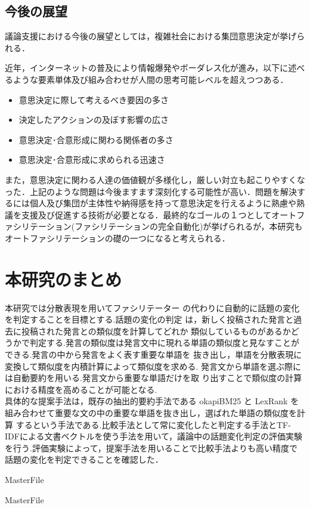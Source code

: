\subsection{今後の展望}
\label{con:future}
議論支援における今後の展望としては，複雑社会における集団意思決定が挙げられる．

近年，インターネットの普及により情報爆発やボーダレス化が進み，以下に述べるような要素単体及び組み合わせが人間の思考可能レベルを超えつつある．
\begin{itemize}
  \item 意思決定に際して考えるべき要因の多さ
  \item 決定したアクションの及ぼす影響の広さ
  \item 意思決定･合意形成に関わる関係者の多さ
  \item 意思決定･合意形成に求められる迅速さ
\end{itemize}
また，意思決定に関わる人達の価値観が多様化し，厳しい対立も起こりやすくなった．上記のような問題は今後ますます深刻化する可能性が高い．問題を解決するには個人及び集団が主体性や納得感を持って意思決定を行えるように熟慮や熟議を支援及び促進する技術が必要となる．最終的なゴールの１つとしてオートファシリテーション(ファシリテーションの完全自動化)が挙げられるが，本研究もオートファシリテーションの礎の一つになると考えられる．

\section{本研究のまとめ}
\label{con:conclusion}
本研究では分散表現を用いてファシリテーター の代わりに自動的に話題の変化を判定することを目標とする.話題の変化の判定 は，新しく投稿された発言と過去に投稿された発言との類似度を計算してどれか 類似しているものがあるかどうかで判定する.発言の類似度は発言文中に現れる単語の類似度と見なすことができる.発言の中から発言をよく表す重要な単語を 抜き出し，単語を分散表現に変換して類似度を内積計算によって類似度を求める. 発言文から単語を選ぶ際には自動要約を用いる.発言文から重要な単語だけを取 り出すことで類似度の計算における精度を高めることが可能となる.\\
具体的な提案手法は，既存の抽出的要約手法である okapiBM25 と LexRank を組み合わせて重要な文の中の重要な単語を抜き出し，選ばれた単語の類似度を計算 するという手法である.比較手法として常に変化したと判定する手法とTF-IDFによる文書ベクトルを使う手法を用いて，議論中の話題変化判定の評価実験を行う.評価実験によって，提案手法を用いることで比較手法よりも高い精度で話題の変化を判定できることを確認した．

 \expandafter\ifx\csname MasterFile\endcsname\relax
	\def\BibFile{hoge}
	
  \fi
  \expandafter\ifx\csname MasterFile\endcsname\relax

\fi
